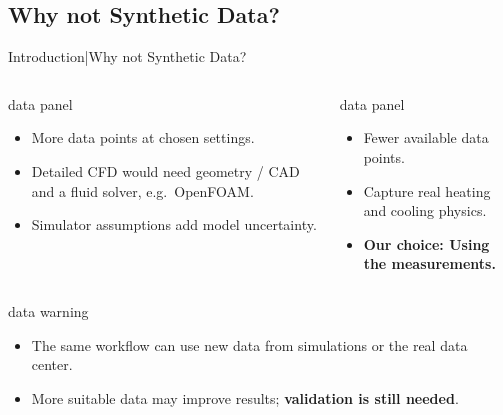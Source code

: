 \subsection{Why not Synthetic Data?}

\begin{frame}{Introduction\enspace|\enspace Why not Synthetic Data?}
  \begin{columns}[T,onlytextwidth]
      \begin{beamercolorbox}[sep=2.5mm,wd=\linewidth]{data panel}
        \small
        \begin{itemize}
          \item More data points at chosen settings.
          \item Detailed CFD would need geometry / CAD and a fluid solver, e.g.\ OpenFOAM.
          \item Simulator assumptions add model uncertainty.
        \end{itemize}
      \end{beamercolorbox}

      \begin{beamercolorbox}[sep=2.5mm,wd=\linewidth]{data panel}
        \small
        \begin{itemize}
          \item Fewer available data points.
          \item Capture real heating and cooling physics.
          \item \textbf{Our choice: Using the measurements.}
        \end{itemize}
      \end{beamercolorbox}
  \end{columns}
  \medskip
  \begin{beamercolorbox}[sep=2mm,wd=\textwidth]{data warning}
    \small
    \begin{itemize}
      \item The same workflow can use new data from simulations or the real data center.
      \item More suitable data may improve results; \textbf{validation is still needed}.
    \end{itemize}
  \end{beamercolorbox}
\end{frame}
